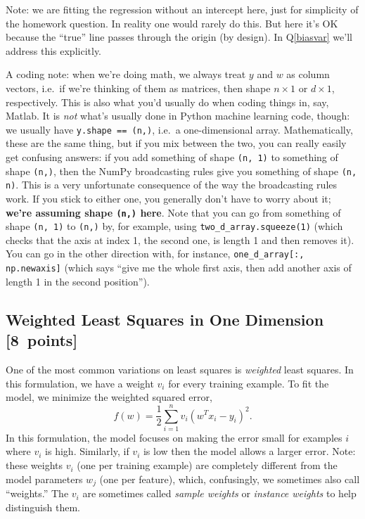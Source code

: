\documentclass{article}
\newcommand\pts[1]{\textcolor{pointscolour}{[#1~points]}}
\begin{document}
Note: we are fitting the regression without an intercept here, just for simplicity of the homework question.
In reality one would rarely do this. But here it's OK because the ``true'' line
passes through the origin (by design). In Q\ref{biasvar} we'll address this explicitly.

A coding note:
when we're doing math, we always treat $y$ and $w$ as column vectors,
i.e.\ if we're thinking of them as matrices, then shape $n \times 1$ or $d \times 1$, respectively.
This is also what you'd usually do when coding things in, say, Matlab.
It is \emph{not} what's usually done in Python machine learning code, though:
we usually have \verb|y.shape == (n,)|, i.e.\ a one-dimensional array.
Mathematically, these are the same thing, but if you mix between the two,
you can really easily get confusing answers:
if you add something of shape \texttt{(n, 1)} to something of shape \texttt{(n,)},
then the NumPy broadcasting rules give you something of shape \texttt{(n, n)}.
This is a very unfortunate consequence of the way the broadcasting rules work.
If you stick to either one, you generally don't have to worry about it;
\textbf{we're assuming shape \texttt{(n,)} here}.
Note that you can go from something of shape \texttt{(n, 1)} to \texttt{(n,)}
by, for example, using \texttt{two\_d\_array.squeeze(1)}
(which checks that the axis at index 1, the second one, is length 1 and then removes it).
You can go in the other direction with, for instance, \texttt{one\_d\_array[:, np.newaxis]}
(which says ``give me the whole first axis, then add another axis of length 1 in the second position'').

\subsection{Weighted Least Squares in One Dimension \pts{8}}

One of the most common variations on least squares is \emph{weighted} least squares. In this formulation, we have a weight $v_i$ for every training example. To fit the model, we minimize the weighted squared error,
\[
f(w) =  \frac{1}{2}\sum_{i=1}^n v_i(w^Tx_i - y_i)^2.
\]
In this formulation, the model focuses on making the error small for examples $i$ where $v_i$ is high. Similarly, if $v_i$ is low then the model allows a larger error. Note: these weights $v_i$ (one per training example) are completely different from the model parameters $w_j$ (one per feature), which, confusingly, we sometimes also call ``weights.'' The $v_i$ are sometimes called \emph{sample weights} or \emph{instance weights} to help distinguish them.
\end{document}
